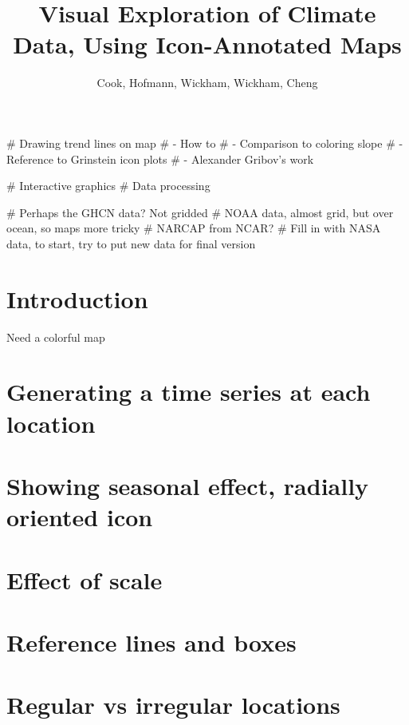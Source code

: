 \documentclass{article}
\begin{document}
\title{Visual Exploration of Climate Data, Using Icon-Annotated Maps}
\author{Cook, Hofmann, Wickham, Wickham, Cheng}

# Drawing trend lines on map
#   - How to
#   - Comparison to coloring slope
#   - Reference to Grinstein icon plots
#   - Alexander Gribov's work

# Interactive graphics
# Data processing

# Perhaps the GHCN data? Not gridded
# NOAA data, almost grid, but over ocean, so maps more tricky
# NARCAP from NCAR?
# Fill in with NASA data, to start, try to put new data for final version

\section{Introduction}

Need a colorful map

\section{Generating a time series at each location}

\section{Showing seasonal effect, radially oriented icon}

\section{Effect of scale}

\section{Reference lines and boxes}

\section{Regular vs irregular locations}
\end{document}
